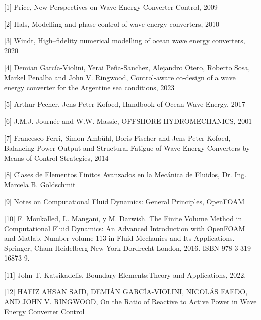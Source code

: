 [1] Price, New Perspectives on Wave Energy Converter Control, 2009

[2] Hals, Modelling and phase control of wave-energy converters, 2010

[3] Windt, High–fidelity numerical modelling of ocean wave energy converters, 2020

[4] Demian García-Violini, Yerai Peña-Sanchez, Alejandro Otero, Roberto Sosa, Markel Penalba and John V. Ringwood, Control-aware co-design of a wave energy converter for the Argentine sea conditions, 2023 

[5] Arthur Pecher, Jens Peter Kofoed, Handbook of Ocean Wave Energy, 2017 

[6] J.M.J. Journée and W.W. Massie, OFFSHORE HYDROMECHANICS, 2001

[7] Francesco Ferri, Simon Ambühl, Boris Fischer and Jens Peter Kofoed, Balancing Power Output and Structural Fatigue of Wave Energy Converters by Means of Control Strategies, 2014

[8] Clases de Elementos Finitos Avanzados en la Mecánica de Fluidos,  Dr. Ing. Marcela B. Goldschmit

[9] Notes on Computational Fluid Dynamics: General Principles, OpenFOAM

[10] F. Moukalled, L. Mangani, y M. Darwish. The Finite Volume Method in Computational Fluid Dynamics: An Advanced Introduction with OpenFOAM and Matlab. Number volume 113 in Fluid Mechanics and Its Applications. Springer, Cham Heidelberg New York Dordrecht London, 2016. ISBN 978-3-319-16873-9.

[11] John T. Katsikadelis, Boundary Elements:Theory and Applications, 2022.

[12] HAFIZ AHSAN SAID, DEMIÁN GARCÍA-VIOLINI, NICOLÁS FAEDO, AND JOHN V. RINGWOOD, On the Ratio of Reactive to Active Power in Wave Energy Converter Control